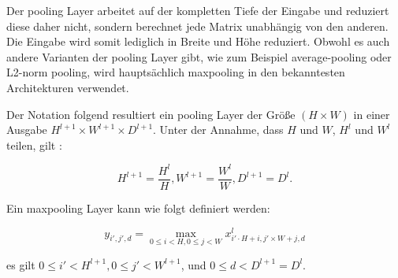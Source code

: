 Der pooling Layer arbeitet auf der kompletten Tiefe der Eingabe und reduziert diese daher nicht, sondern berechnet jede Matrix unabh\"angig von den anderen. Die Eingabe wird somit lediglich in Breite und H\"ohe reduziert. Obwohl es auch andere Varianten der pooling Layer gibt, wie zum Beispiel average-pooling oder L2-norm pooling, wird haupts\"achlich maxpooling in den bekanntesten Architekturen verwendet.

Der Notation folgend resultiert ein pooling Layer der Gr\"o\ss{}e $(H \times W)$ in einer Ausgabe $H^{l+1} \times W^{l+1} \times D^{l+1}$. Unter der Annahme, dass $H$ und $W$, $H^l$ und $W^l$ teilen, gilt \parencite{Wu.2017}:

\begin{equation}
H^{l+1} = \frac{H^l}{H}, W^{l+1} = \frac{W^l}{W}, D^{l+1} = D^l.
\end{equation} 

Ein maxpooling Layer kann wie folgt definiert werden:

\begin{equation}
y_{i', j', d} = \max_{0 \leq i<H, 0 \leq j <W} x^{l}_{i' \cdot H + i, j' \times W + j, d}
\end{equation}

es gilt $0 \leq i' < H^{l+1}, 0 \leq j' < W^{l+1}$, und $0 \leq d < D^{l+1} = D^l$.  